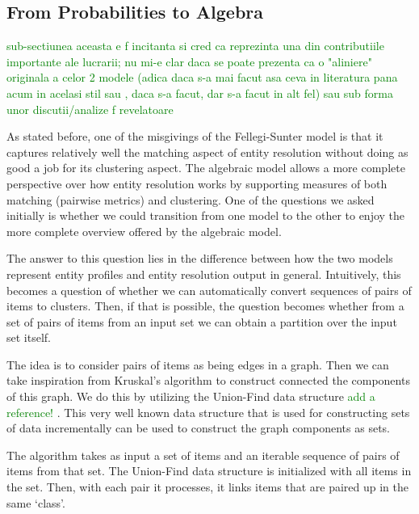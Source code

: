 \documentclass[journal]{IEEEtran}
\begin{document}
    \subsection{From Probabilities to Algebra}\label{subsec:fsm-alg}

    \textcolor{green}{sub-sectiunea aceasta e f incitanta si cred ca reprezinta una din contributiile importante ale lucrarii; nu mi-e clar daca se poate prezenta ca o "aliniere" originala a celor 2 modele (adica daca s-a mai facut asa ceva in literatura pana acum in acelasi stil sau , daca s-a facut, dar s-a facut in alt fel) sau sub forma unor discutii/analize f revelatoare}
    
    As stated before, one of the misgivings of the Fellegi-Sunter model is that
    it captures relatively well the matching aspect of entity resolution without
    doing as good a job for its clustering aspect.
    The algebraic model allows a more complete perspective over how entity
    resolution works by supporting measures of both matching (pairwise metrics)
    and clustering.
    One of the questions we asked initially is whether we could transition from
    one model to the other to enjoy the more complete overview offered by the
    algebraic model.

    The answer to this question lies in the difference between how the two
    models represent entity profiles and entity resolution output in general.
    Intuitively, this becomes a question of whether we can automatically convert
    sequences of pairs of items to clusters.
    Then, if that is possible, the question becomes whether from a set of pairs
    of items from an input set we can obtain a partition over the input set
    itself.

    The idea is to consider pairs of items as being edges in a graph.
    Then we can take inspiration from Kruskal's algorithm to construct connected
    the components of this graph.
    We do this by utilizing the Union-Find data structure 
    \textcolor{green}{add a reference!}
    .
    This very well known data structure that is used for constructing sets of
    data incrementally can be used to construct the graph components as sets.

    The algorithm takes as input a set of items and an iterable sequence of
    pairs of items from that set.
    The Union-Find data structure is initialized with all items in the set.
    Then, with each pair it processes, it links items that are paired up in
    the same `class'.
\end{document}
